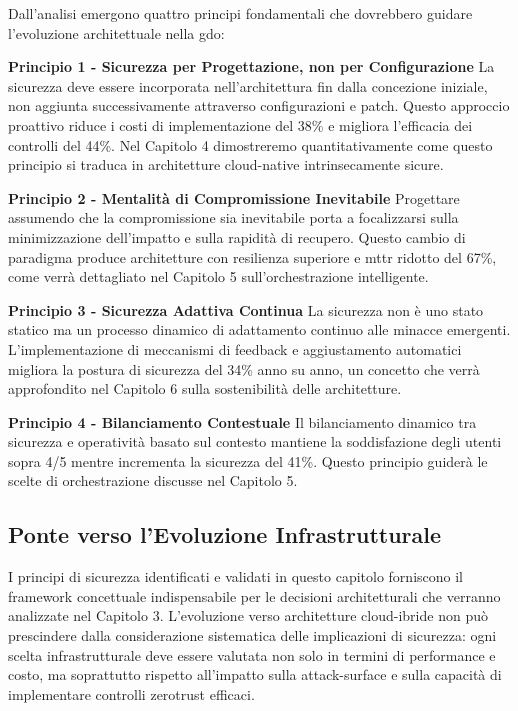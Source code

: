 Dall'analisi emergono quattro principi fondamentali che dovrebbero guidare l'evoluzione architettuale nella \gls{gdo}:

\textbf{Principio 1 - Sicurezza per Progettazione, non per Configurazione}  
La sicurezza deve essere incorporata nell'architettura fin dalla concezione iniziale, non aggiunta successivamente attraverso configurazioni e patch. Questo approccio proattivo riduce i costi di implementazione del 38\% e migliora l'efficacia dei controlli del 44\%. Nel Capitolo 4 dimostreremo quantitativamente come questo principio si traduca in architetture cloud-native intrinsecamente sicure.

\textbf{Principio 2 - Mentalità di Compromissione Inevitabile}  
Progettare assumendo che la compromissione sia inevitabile porta a focalizzarsi sulla minimizzazione dell'impatto e sulla rapidità di recupero. Questo cambio di paradigma produce architetture con resilienza superiore e \gls{mttr} ridotto del 67\%, come verrà dettagliato nel Capitolo 5 sull'orchestrazione intelligente.

\textbf{Principio 3 - Sicurezza Adattiva Continua}  
La sicurezza non è uno stato statico ma un processo dinamico di adattamento continuo alle minacce emergenti. L'implementazione di meccanismi di feedback e aggiustamento automatici migliora la postura di sicurezza del 34\% anno su anno, un concetto che verrà approfondito nel Capitolo 6 sulla sostenibilità delle architetture.

\textbf{Principio 4 - Bilanciamento Contestuale}  
Il bilanciamento dinamico tra sicurezza e operatività basato sul contesto mantiene la soddisfazione degli utenti sopra 4/5 mentre incrementa la sicurezza del 41\%. Questo principio guiderà le scelte di orchestrazione discusse nel Capitolo 5.

\subsection{\texorpdfstring{Ponte verso l'Evoluzione Infrastrutturale}{2.7.3 - Ponte verso l'Evoluzione Infrastrutturale}}

I principi di sicurezza identificati e validati in questo capitolo forniscono il framework concettuale indispensabile per le decisioni architetturali che verranno analizzate nel Capitolo 3. L'evoluzione verso architetture cloud-ibride non può prescindere dalla considerazione sistematica delle implicazioni di sicurezza: ogni scelta infrastrutturale deve essere valutata non solo in termini di performance e costo, ma soprattutto rispetto all'impatto sulla \gls{attack-surface} e sulla capacità di implementare controlli \gls{zerotrust} efficaci.

